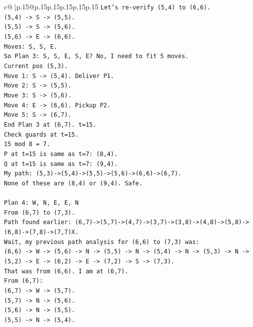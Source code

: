 \documentclass{article}
\begin{document}
{\begin{supertabular}{c@{$\;$}|p{.15\linewidth}@{}p{.15\linewidth}p{.15\linewidth}p{.15\linewidth}p{.15\linewidth}p{.15\linewidth}}
{{{\texttt{Let's re{-}verify (5,4) to (6,6).} \\
\texttt{(5,4) {-}> S {-}> (5,5).} \\
\texttt{(5,5) {-}> S {-}> (5,6).} \\
\texttt{(5,6) {-}> E {-}> (6,6).} \\
\texttt{Moves: S, S, E.} \\
\texttt{So Plan 3: S, S, E, S, E? No, I need to fit 5 moves.} \\
\texttt{Current pos (5,3).} \\
\texttt{Move 1: S {-}> (5,4). Deliver P1.} \\
\texttt{Move 2: S {-}> (5,5).} \\
\texttt{Move 3: S {-}> (5,6).} \\
\texttt{Move 4: E {-}> (6,6). Pickup P2.} \\
\texttt{Move 5: S {-}> (6,7).} \\
\texttt{End Plan 3 at (6,7). t=15.} \\
\texttt{Check guards at t=15.} \\
\texttt{15 mod 8 = 7.} \\
\texttt{P at t=15 is same as t=7: (8,4).} \\
\texttt{Q at t=15 is same as t=7: (9,4).} \\
\texttt{My path: (5,3){-}>(5,4){-}>(5,5){-}>(5,6){-}>(6,6){-}>(6,7).} \\
\texttt{None of these are (8,4) or (9,4). Safe.} \\
\\ 
\texttt{Plan 4: W, N, E, E, N} \\
\texttt{From (6,7) to (7,3).} \\
\texttt{Path found earlier: (6,7){-}>(5,7){-}>(4,7){-}>(3,7){-}>(3,8){-}>(4,8){-}>(5,8){-}>(6,8){-}>(7,8){-}>(7,7)X.} \\
\texttt{Wait, my previous path analysis for (6,6) to (7,3) was:} \\
\texttt{(6,6) {-}> W {-}> (5,6) {-}> N {-}> (5,5) {-}> N {-}> (5,4) {-}> N {-}> (5,3) {-}> N {-}> (5,2) {-}> E {-}> (6,2) {-}> E {-}> (7,2) {-}> S {-}> (7,3).} \\
\texttt{That was from (6,6). I am at (6,7).} \\
\texttt{From (6,7):} \\
\texttt{(6,7) {-}> W {-}> (5,7).} \\
\texttt{(5,7) {-}> N {-}> (5,6).} \\
\texttt{(5,6) {-}> N {-}> (5,5).} \\
\texttt{(5,5) {-}> N {-}> (5,4).} \\
}}}
\end{supertabular}}
\end{document}
